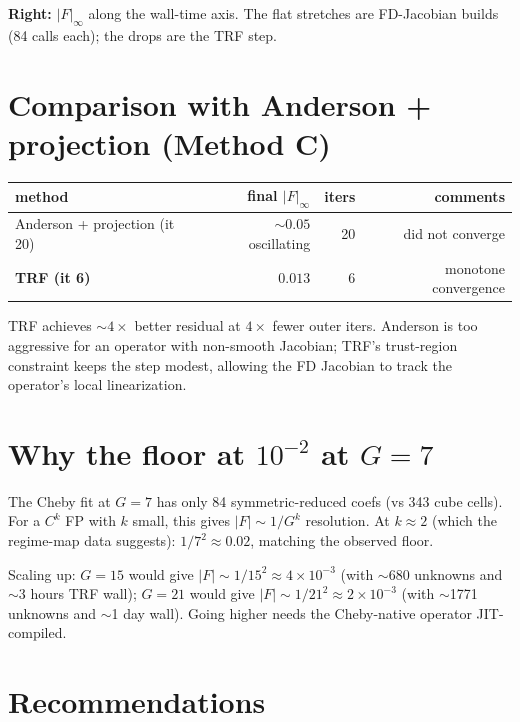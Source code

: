 \documentclass[11pt]{article}
\begin{document}
\textbf{Right:} $|F|_\infty$ along the wall-time axis. The flat stretches
are FD-Jacobian builds (84 calls each); the drops are the TRF step.

\section{Comparison with Anderson + projection (Method C)}

\begin{center}
\begin{tabular}{lrrr}
\toprule
method                    & final $|F|_\infty$ & iters &  comments \\
\midrule
Anderson + projection (it 20) & $\sim 0.05$ oscillating & 20 & did not converge \\
\textbf{TRF (it 6)}            & $\mathbf{0.013}$       & 6 & monotone convergence \\
\bottomrule
\end{tabular}
\end{center}

TRF achieves $\sim 4\times$ better residual at $4\times$ fewer outer iters.
Anderson is too aggressive for an operator with non-smooth Jacobian; TRF's
trust-region constraint keeps the step modest, allowing the FD Jacobian
to track the operator's local linearization.

\section{Why the floor at $10^{-2}$ at $G=7$}

The Cheby fit at $G=7$ has only 84 symmetric-reduced coefs (vs 343 cube
cells). For a $C^k$ FP with $k$ small, this gives $|F| \sim 1/G^k$
resolution. At $k \approx 2$ (which the regime-map data suggests): $1/7^2
\approx 0.02$, matching the observed floor.

Scaling up: $G=15$ would give $|F| \sim 1/15^2 \approx 4 \times 10^{-3}$
(with $\sim$680 unknowns and $\sim$3 hours TRF wall);
$G=21$ would give $|F| \sim 1/21^2 \approx 2 \times 10^{-3}$ (with $\sim$1771
unknowns and $\sim$1 day wall). Going higher needs the Cheby-native operator
JIT-compiled.

\section{Recommendations}
\end{document}
